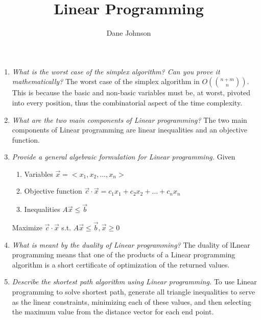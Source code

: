 \documentclass[a4paper,12pt]{article}
\author{Dane Johnson}
\title{Linear Programming}
\begin{document}
\maketitle
\begin{enumerate}
\item {\it What is the worst case of the simplex algorithm? Can you prove it mathematically?} The worst case of the
  simplex algorithm in $O({{n+m}\choose{n}})$. This is because the basic and non-basic variables must be, at worst, pivoted
  into every position, thus the combinatorial aspect of the time complexity.
\item {\it What are the two main components of Linear programming?} The two main components of Linear programming are
  linear inequalities and an objective function.
\item {\it Provide a general algebraic formulation for Linear programming.} Given
  \begin{enumerate}
  \item Variables $\vec{x} = <x_{1}, x_{2}, \ldots, x_{n}>$
  \item Objective function $\vec{c}\cdot\vec{x} = c_1x_1 + c_2x_2 + \ldots + c_nx_n$
  \item Inequalities $A\vec{x} \leq \vec{b}$
  \end{enumerate}
  Maximize $\vec{c}\cdot\vec{x}$ s.t. $A\vec{x} \leq \vec{b}, \vec{x} \geq 0$
\item {\it What is meant by the duality of Linear programming?} The duality of lLnear programming means that one
  of the products of a Linear programming algorithm is a short certificate of optimization of the returned values.
\item {\it Describe the shortest path algorithm using Linear programming.} To use Linear programming to solve shortest path,
  generate all triangle inequalities to serve as the linear constraints, minimizing each of these values, and then
  selecting the maximum value from the distance vector for each end point.
\end{enumerate}
\end{document}
